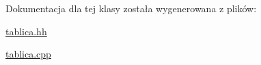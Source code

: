 Dokumentacja dla tej klasy została wygenerowana z plików\-:\begin{DoxyCompactItemize}
\item 
\hyperlink{tablica_8hh}{tablica.\-hh}\item 
\hyperlink{tablica_8cpp}{tablica.\-cpp}\end{DoxyCompactItemize}
